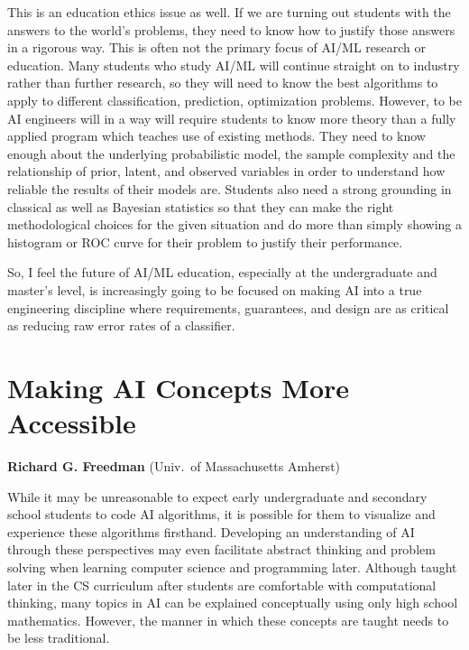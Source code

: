 \documentclass[letterpaper]{article}
\begin{document}
This is an education ethics issue as well. If we are turning out students with the answers to the world's problems, they need to know how to justify those answers in a rigorous way. This is often not the primary focus of AI/ML research or education. Many students who study AI/ML will continue straight on to industry rather than further research, so they will need to know the best algorithms to apply to different classification, prediction, optimization problems. However, to be AI engineers will in a way will require students to know more theory than a fully applied program which teaches use of existing methods. They need to know enough about the underlying probabilistic model, the sample complexity and the relationship of prior, latent, and observed variables in order to understand how reliable the results of their models are.  Students also need a strong grounding in classical as well as Bayesian statistics so that they can make the right methodological choices for the given situation and do more than simply showing a histogram or ROC curve for their problem to justify their performance.

So, I feel the future of AI/ML education, especially at the undergraduate and master's level, is increasingly going to be focused on making AI into a true engineering discipline where requirements, guarantees, and design are as critical as reducing raw error rates of a classifier.



\section{Making AI Concepts More Accessible}
\begin{center}
{\bf Richard G. Freedman} (Univ.~of Massachusetts Amherst)
\end{center}

While it may be unreasonable to expect early undergraduate and secondary school students to code AI algorithms, it is possible for them to visualize and experience these algorithms firsthand.  Developing an understanding of AI through these perspectives may even facilitate abstract thinking and problem solving when learning computer science and programming later.  Although taught later in the CS curriculum after students are comfortable with computational thinking, many topics in AI can be explained conceptually using only high school mathematics.  However, the manner in which these concepts are taught needs to be less traditional.
\end{document}
